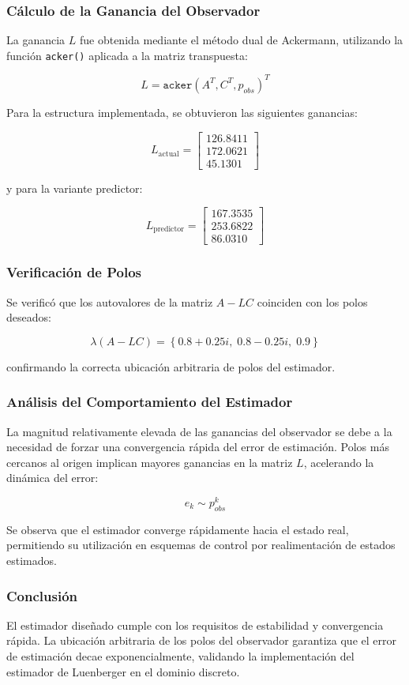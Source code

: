 \subsubsection{Cálculo de la Ganancia del Observador}

La ganancia \(L\) fue obtenida mediante el método dual de Ackermann,
utilizando la función \texttt{acker()} aplicada a la matriz transpuesta:

\[
L = \texttt{acker}(A^T, C^T, p_{obs})^T
\]

Para la estructura implementada, se obtuvieron las siguientes ganancias:

\[
L_{\text{actual}} =
\begin{bmatrix}
	126.8411 \\
	172.0621 \\
	45.1301
\end{bmatrix}
\]

y para la variante predictor:

\[
L_{\text{predictor}} =
\begin{bmatrix}
	167.3535 \\
	253.6822 \\
	86.0310
\end{bmatrix}
\]

\subsubsection{Verificación de Polos}

Se verificó que los autovalores de la matriz \(A - LC\) coinciden con
los polos deseados:

\[
\lambda(A - LC) =
\left\{
0.8 + 0.25i,\;
0.8 - 0.25i,\;
0.9
\right\}
\]

confirmando la correcta ubicación arbitraria de polos del estimador.

\subsubsection{Análisis del Comportamiento del Estimador}

La magnitud relativamente elevada de las ganancias del observador se
debe a la necesidad de forzar una convergencia rápida del error de
estimación. Polos más cercanos al origen implican mayores ganancias en
la matriz \(L\), acelerando la dinámica del error:

\[
e_k \sim p_{obs}^k
\]

Se observa que el estimador converge rápidamente hacia el estado real,
permitiendo su utilización en esquemas de control por realimentación
de estados estimados.

\subsubsection{Conclusión}

El estimador diseñado cumple con los requisitos de estabilidad y
convergencia rápida. La ubicación arbitraria de los polos del
observador garantiza que el error de estimación decae exponencialmente,
validando la implementación del estimador de Luenberger en el dominio
discreto.

